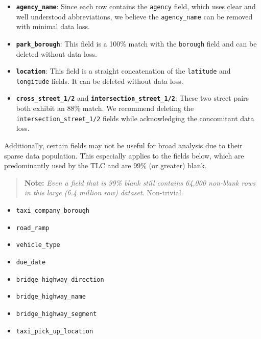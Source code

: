 \documentclass[linenumber]{jdsart}
\begin{document}
\begin{itemize}
    \item \textbf{\texttt{agency\_name}}: Since each row contains the \texttt{agency} 
    field, which uses clear and well understood abbreviations, we believe the
    \texttt{agency\_name} can be removed with minimal data loss.
    
    \item \textbf{\texttt{park\_borough}}: This field is a 100\% match with 
    the \texttt{borough} field and can be deleted without data loss.
    
    \item \textbf{\texttt{location}}: This field is a straight concatenation of 
    the \texttt{latitude} and \texttt{longitude} fields. It can be 
    deleted without data loss.
     
    \item \textbf{\texttt{cross\_street\_1/2}} and \textbf{\texttt{intersection\_street\_1/2}}: 
    These two street pairs both exhibit an 88\% match. We recommend deleting the 
    \texttt{intersection\_street\_1/2} fields while acknowledging 
    the concomitant data loss.
\end{itemize}

Additionally, certain fields may not be useful for broad analysis
due to their sparse data population. This especially applies to the fields below, 
which are predominantly used by the TLC and are 99\% (or greater) blank.

\begin{quote}
\textbf{Note:} \textit{Even a field that is 99\% blank still contains 64,000 
non\mbox{-}blank rows in this large (6.4 million row) 
dataset.} Non\mbox{-}trivial.
\end{quote}

\begin{itemize}
    \item \texttt{taxi\_company\_borough}
    \item \texttt{road\_ramp}
    \item \texttt{vehicle\_type}
    \item \texttt{due\_date}
    \item \texttt{bridge\_highway\_direction}
    \item \texttt{bridge\_highway\_name}
    \item \texttt{bridge\_highway\_segment}
    \item \texttt{taxi\_pick\_up\_location}
\end{itemize}
\end{document}
